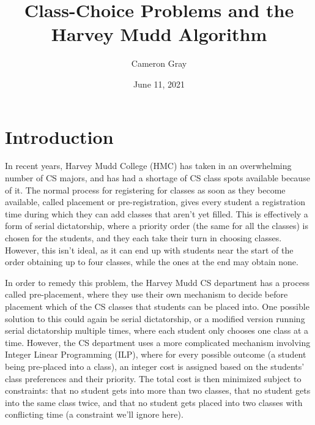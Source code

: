 \documentclass[12pt,letterpaper]{extarticle}
\title{Class-Choice Problems and the Harvey Mudd Algorithm}
\author{Cameron Gray}
\date{June 11, 2021}
\begin{document}
\maketitle

\section{Introduction}
In recent years, Harvey Mudd College (HMC) has taken in an overwhelming number of CS majors, and has had a shortage of CS class spots available because of it. The normal process for registering for classes as soon as they become available, called placement or pre-registration, gives every student a registration time during which they can add classes that aren't yet filled. This is effectively a form of serial dictatorship, where a priority order (the same for all the classes) is chosen for the students, and they each take their turn in choosing classes. However, this isn't ideal, as it can end up with students near the start of the order obtaining up to four classes, while the ones at the end may obtain none. \cite{hmc}

In order to remedy this problem, the Harvey Mudd CS department has a process called pre-placement, where they use their own mechanism to decide before placement which of the CS classes that students can be placed into. One possible solution to this could again be serial dictatorship, or a modified version running serial dictatorship multiple times, where each student only chooses one class at a time. However, the CS department uses a more complicated mechanism involving Integer Linear Programming (ILP), where for every possible outcome (a student being pre-placed into a class), an integer cost is assigned based on the students' class preferences and their priority. The total cost is then minimized subject to constraints: that no student gets into more than two classes, that no student gets into the same class twice, and that no student gets placed into two classes with conflicting time (a constraint we'll ignore here).
\end{document}
